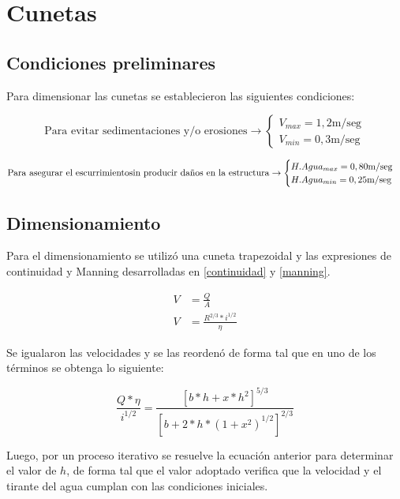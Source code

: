 \documentclass[../main.tex]{subfiles}
\begin{document}
\section{Cunetas}

\subsection{Condiciones preliminares}
Para dimensionar las cunetas se establecieron las siguientes condiciones:

\begin{equation*}
\text{Para evitar sedimentaciones y/o erosiones} \rightarrow
\begin{cases}
V_{max} = 1,2 \text{m/seg} \\
V_{min} = 0,3 \text{m/seg}
\end{cases}
\end{equation*}

\begin{equation*}
\text{Para asegurar el escurrimiento} \\ \text{sin producir daños en la estructura} \rightarrow
\begin{cases}
H. Agua_{max} = 0,80 \text{m/seg} \\
H. Agua_{min} = 0,25 \text{m/seg}
\end{cases}
\end{equation*}

\subsection{Dimensionamiento}
Para el dimensionamiento se utilizó una cuneta trapezoidal y las expresiones de continuidad y Manning desarrolladas en \cref{continuidad} y \cref{manning}. \cite{presentaciones}

\begin{align}
    V &= \frac{Q}{A} \label{continuidad} \\
    V &= \frac{R^{2/3}*i^{1/2}}{\eta} \label{manning}
\end{align}

Se igualaron las velocidades y se las reordenó de forma tal que en uno de los términos se obtenga lo siguiente:

\begin{equation}
    \frac{Q*\eta}{i^{1/2}} = \frac{[b*h + x*h^2]^{5/3}}{[b + 2*h*(1+x^2)^{1/2}]^{2/3}}
\end{equation}

Luego, por un proceso iterativo se resuelve la ecuación anterior para determinar el valor de $h$, de forma tal que el valor adoptado verifica que la velocidad y el tirante  del agua cumplan con las condiciones iniciales.
\end{document}
